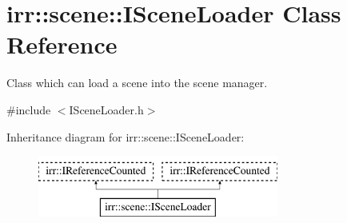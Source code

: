 \hypertarget{classirr_1_1scene_1_1ISceneLoader}{}\section{irr\+:\+:scene\+:\+:I\+Scene\+Loader Class Reference}
\label{classirr_1_1scene_1_1ISceneLoader}


Class which can load a scene into the scene manager.  




{\ttfamily \#include $<$I\+Scene\+Loader.\+h$>$}

Inheritance diagram for irr\+:\+:scene\+:\+:I\+Scene\+Loader\+:\begin{figure}[H]
\begin{center}
\leavevmode
\includegraphics[height=2.000000cm]{classirr_1_1scene_1_1ISceneLoader}
\end{center}
\end{figure}
